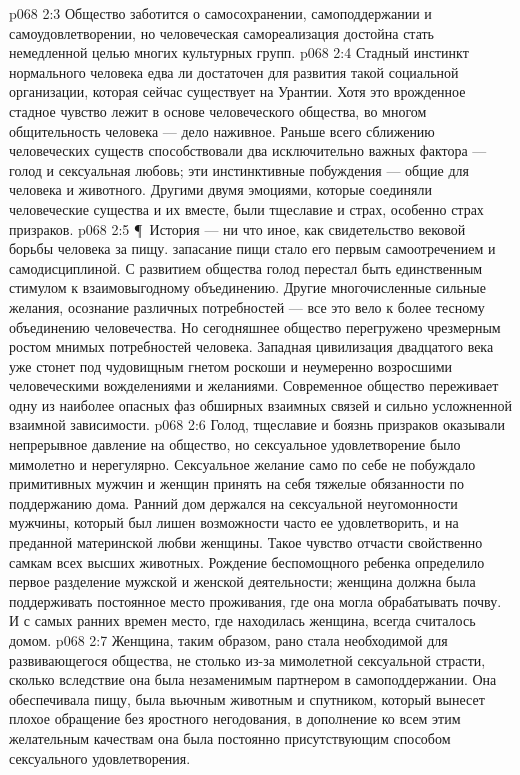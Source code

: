 \vs p068 2:3 Общество заботится о самосохранении, самоподдержании и самоудовлетворении, но человеческая самореализация достойна стать немедленной целью многих культурных групп.
\vs p068 2:4 Стадный инстинкт нормального человека едва ли достаточен для развития такой социальной организации, которая сейчас существует на Урантии. Хотя это врожденное стадное чувство лежит в основе человеческого общества, во многом общительность человека --- дело наживное. Раньше всего сближению человеческих существ способствовали два исключительно важных фактора --- голод и сексуальная любовь; эти инстинктивные побуждения --- общие для человека и животного. Другими двумя эмоциями, которые соединяли человеческие существа и  их вместе, были тщеславие и страх, особенно страх призраков.
\vs p068 2:5 \P\ История --- ни что иное, как свидетельство вековой борьбы человека за пищу.  запасание пищи стало его первым самоотречением и самодисциплиной. С развитием общества голод перестал быть единственным стимулом к взаимовыгодному объединению. Другие многочисленные сильные желания, осознание различных потребностей --- все это вело к более тесному объединению человечества. Но сегодняшнее общество перегружено чрезмерным ростом мнимых потребностей человека. Западная цивилизация двадцатого века уже стонет под чудовищным гнетом роскоши и неумеренно возросшими человеческими вожделениями и желаниями. Современное общество переживает одну из наиболее опасных фаз обширных взаимных связей и сильно усложненной взаимной зависимости.
\vs p068 2:6 Голод, тщеславие и боязнь призраков оказывали непрерывное давление на общество, но сексуальное удовлетворение было мимолетно и нерегулярно. Сексуальное желание само по себе не побуждало примитивных мужчин и женщин принять на себя тяжелые обязанности по поддержанию дома. Ранний дом держался на сексуальной неугомонности мужчины, который был лишен возможности часто ее удовлетворить, и на преданной материнской любви женщины. Такое чувство отчасти свойственно самкам всех высших животных. Рождение беспомощного ребенка определило первое разделение мужской и женской деятельности; женщина должна была поддерживать постоянное место проживания, где она могла обрабатывать почву. И с самых ранних времен место, где находилась женщина, всегда считалось домом.
\vs p068 2:7 Женщина, таким образом, рано стала необходимой для развивающегося общества, не столько из\hyp{}за мимолетной сексуальной страсти, сколько вследствие  она была незаменимым партнером в самоподдержании. Она обеспечивала пищу, была вьючным животным и спутником, который вынесет плохое обращение без яростного негодования, в дополнение ко всем этим желательным качествам она была постоянно присутствующим способом сексуального удовлетворения.
